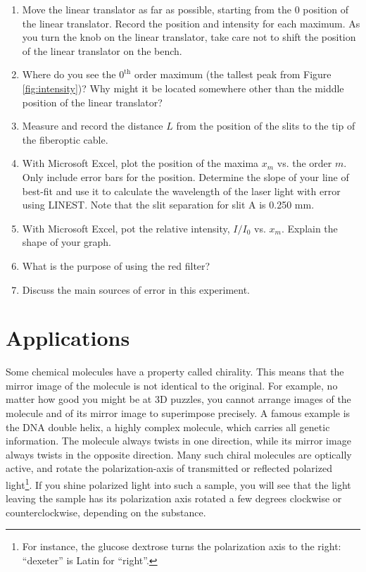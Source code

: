 \begin{enumerate}
\item Move the linear translator as far as possible, starting from the 0 position of the linear translator. Record the position and intensity for each maximum. As you turn the knob on the linear translator, take care not to shift the position of the linear translator on the bench.

\item Where do you see the $0^{\mathrm{th}}$ order maximum (the tallest peak from Figure \ref{fig:intensity})? Why might it be located somewhere other than the middle position of the linear translator?

\item Measure and record the distance $L$ from the position of the slits to the tip of the fiberoptic cable.

\item With Microsoft Excel, plot the position of the maxima $x_m$ vs. the order $m$. Only include error bars for the position. Determine the slope of your line of best-fit and use it to calculate the wavelength of the laser light with error using LINEST. Note that the slit separation for slit A is 0.250 mm.

\item With Microsoft Excel, pot the relative intensity, $I/I_0$ vs. $x_m$. Explain the shape of your graph.

\item What is the purpose of using the red filter?

\item Discuss the main sources of error in this experiment.
\end{enumerate}

\section{Applications}
Some chemical molecules have a property called chirality. This means that the mirror image of the molecule is not identical to the original. For example, no matter how good you might be at 3D puzzles, you cannot arrange images of the molecule and of its mirror image to superimpose precisely. A famous example is the DNA double helix, a highly complex molecule, which carries all genetic information. The molecule always twists in one direction, while its mirror image always twists in the opposite direction. Many such chiral molecules are optically active, and rotate the polarization-axis of transmitted or reflected polarized light\footnote{For instance, the glucose dextrose turns the polarization axis to the right: ``dexeter'' is Latin for ``right''.}. If you shine polarized light into such a sample, you will see that the light leaving the sample has its polarization axis rotated a few degrees clockwise or counterclockwise, depending on the substance.\myskip

